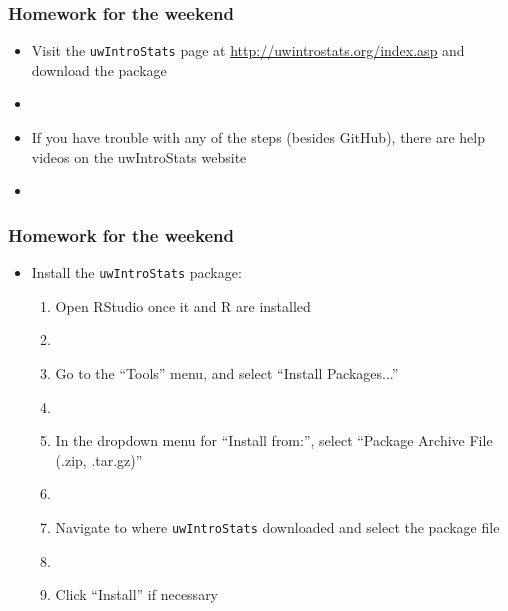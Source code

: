 \documentclass[12pt]{beamer}
\newcommand{\myframe}[1]{\begin{frame} \frametitle{#1}}
\begin{document}
\myframe{Homework for the weekend}
\begin{itemize}
\item Visit the \texttt{uwIntroStats} page at \url{http://uwintrostats.org/index.asp} and download the package
\item[]
\item If you have trouble with any of the steps (besides GitHub), there are help videos on the uwIntroStats website
\item[]
\end{itemize}
\end{frame}

\myframe{Homework for the weekend}
\begin{itemize}
\item Install the \texttt{uwIntroStats} package:
\begin{enumerate}
\item Open RStudio once it and R are installed
\item[]
\item Go to the ``Tools'' menu, and select ``Install Packages...''
\item[]
\item In the dropdown menu for ``Install from:'', select ``Package Archive File (.zip, .tar.gz)''
\item[]
\item Navigate to where \texttt{uwIntroStats} downloaded and select the package file
\item[]
\item Click ``Install'' if necessary
\end{enumerate}
\end{itemize}
\end{frame}
\end{document}

